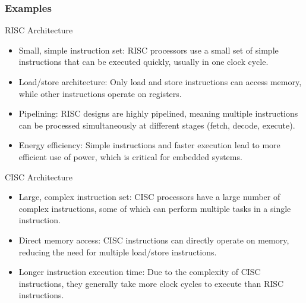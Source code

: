 \documentclass[aspectratio=169]{beamer}
\begin{document}
\subsubsection{Examples}
\begin{frame}{RISC Architecture}
  \begin{itemize}
      \item <1-> Small, simple instruction set: RISC processors use a small set of simple instructions that can be executed quickly, usually in one clock cycle.
      \item <2-> Load/store architecture: Only load and store instructions can access memory, while other instructions operate on registers.
      \item <3-> Pipelining: RISC designs are highly pipelined, meaning multiple instructions can be processed simultaneously at different stages (fetch, decode, execute).
      \item <4-> Energy efficiency: Simple instructions and faster execution lead to more efficient use of power, which is critical for embedded systems.
  \end{itemize}
\end{frame}

\begin{frame}{CISC Architecture}
    \begin{itemize}
        \item <1-> Large, complex instruction set: CISC processors have a large number of complex instructions, some of which can perform multiple tasks in a single instruction.
        \item <2-> Direct memory access: CISC instructions can directly operate on memory, reducing the need for multiple load/store instructions.
        \item <3-> Longer instruction execution time: Due to the complexity of CISC instructions, they generally take more clock cycles to execute than RISC instructions.
    \end{itemize}
\end{frame}
\end{document}
